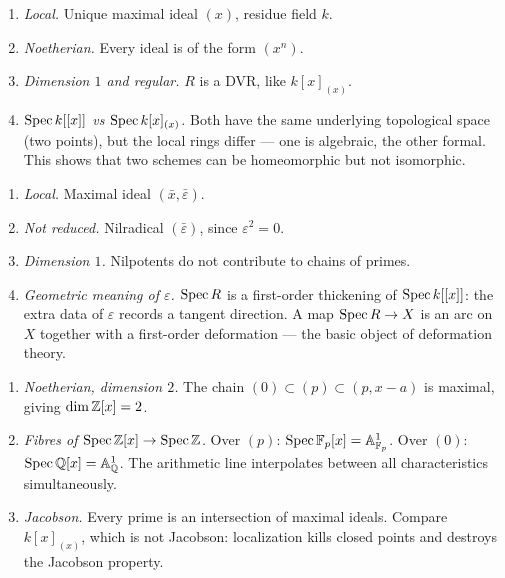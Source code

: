 \documentclass[a4paper, 12pt]{article}
\begin{document}

\begin{example}
\leavevmode\begin{enumerate}
\item \emph{Local.} Unique maximal ideal $(x)$, residue field $k$.
\item \emph{Noetherian.} Every ideal is of the form $(x^n)$.
\item \emph{Dimension $1$ and regular.} $R$ is a DVR, like $k[x]_{(x)}$.
\item \emph{$\operatorname{Spec} k[[x]]$ vs $\operatorname{Spec} k[x]_{(x)}$.} Both have the same underlying
  topological space (two points), but the local rings differ — one is algebraic,
  the other formal. This shows that two schemes can be homeomorphic but not isomorphic.
\end{enumerate}
\end{example}


\begin{example}
\leavevmode\begin{enumerate}
\item \emph{Local.} Maximal ideal $(\bar x, \bar\varepsilon)$.
\item \emph{Not reduced.} Nilradical $(\bar\varepsilon)$, since $\varepsilon^2 = 0$.
\item \emph{Dimension $1$.} Nilpotents do not contribute to chains of primes.
\item \emph{Geometric meaning of $\varepsilon$.} $\operatorname{Spec} R$ is a first-order thickening
  of $\operatorname{Spec} k[[x]]$: the extra data of $\varepsilon$ records a tangent direction.
  A map $\operatorname{Spec} R \to X$ is an arc on $X$ together with a first-order deformation —
  the basic object of deformation theory.
\end{enumerate}
\end{example}


\begin{example}[{$R = \ZZ[x]$, the arithmetic line}]
\leavevmode\begin{enumerate}
\item \emph{Noetherian, dimension $2$.} The chain
  $(0) \subset (p) \subset (p, x-a)$ is maximal, giving $\dim \mathbb{Z}[x] = 2$.
\item \emph{Fibres of $\operatorname{Spec} \mathbb{Z}[x] \to \operatorname{Spec} \mathbb{Z}$.} Over $(p)$:
  $\operatorname{Spec} \mathbb{F}_p[x] = \mathbb{A}^1_{\mathbb{F}_p}$. Over $(0)$:
  $\operatorname{Spec} \mathbb{Q}[x] = \mathbb{A}^1_{\mathbb{Q}}$. The arithmetic line interpolates between
  all characteristics simultaneously.
\item \emph{Jacobson.} Every prime is an intersection of maximal ideals.
  Compare $k[x]_{(x)}$, which is not Jacobson: localization kills closed points
  and destroys the Jacobson property.
\end{enumerate}
\end{example}
\end{document}
